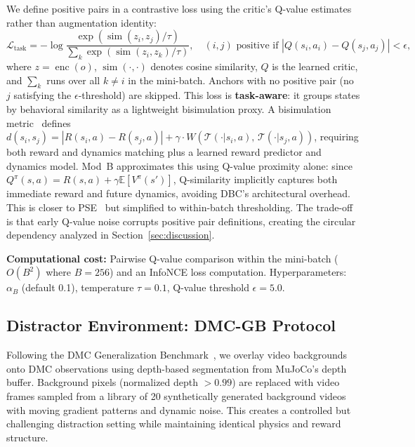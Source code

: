 \documentclass{article}
\begin{document}
We define positive pairs in a contrastive loss using the critic's Q-value estimates rather than augmentation identity:
\begin{equation}
  \mathcal{L}_{\text{task}} = -\log \frac{\exp(\operatorname{sim}(z_i, z_j) / \tau)}{\sum_{k} \exp(\operatorname{sim}(z_i, z_k) / \tau)}, \quad (i, j) \text{ positive if } |Q(s_i, a_i) - Q(s_j, a_j)| < \epsilon,
  \label{eq:contrastive}
\end{equation}
where $z = \operatorname{enc}(o)$, $\operatorname{sim}(\cdot,\cdot)$ denotes cosine similarity, $Q$ is the learned critic, and $\sum_k$ runs over all $k \neq i$ in the mini-batch. Anchors with no positive pair (no $j$ satisfying the $\epsilon$-threshold) are skipped.
This loss is \textbf{task-aware}: it groups states by behavioral similarity as a lightweight bisimulation proxy.
A bisimulation metric~\citep{zhang2021learning} defines $d(s_i, s_j) = |R(s_i, a) - R(s_j, a)| + \gamma \cdot W(\mathcal{T}(\cdot|s_i,a),\, \mathcal{T}(\cdot|s_j,a))$, requiring both reward and dynamics matching plus a learned reward predictor and dynamics model.
Mod~B approximates this using Q-value proximity alone: since $Q^\pi(s,a) = R(s,a) + \gamma \mathbb{E}[V^\pi(s')]$, Q-similarity implicitly captures both immediate reward and future dynamics, avoiding DBC's architectural overhead.
This is closer to PSE~\citep{agarwal2021contrastive} but simplified to within-batch thresholding.
The trade-off is that early Q-value noise corrupts positive pair definitions, creating the circular dependency analyzed in Section~\ref{sec:discussion}.

\textbf{Computational cost:} Pairwise Q-value comparison within the mini-batch ($O(B^2)$ where $B=256$) and an InfoNCE loss computation.
Hyperparameters: $\alpha_B$ (default 0.1), temperature $\tau=0.1$, Q-value threshold $\epsilon=5.0$.

\subsection{Distractor Environment: DMC-GB Protocol}

Following the DMC Generalization Benchmark~\citep{hansen2021softda}, we overlay video backgrounds onto DMC observations using depth-based segmentation from MuJoCo's depth buffer.
Background pixels (normalized depth $> 0.99$) are replaced with video frames sampled from a library of 20 synthetically generated background videos with moving gradient patterns and dynamic noise.
This creates a controlled but challenging distraction setting while maintaining identical physics and reward structure.
\end{document}
